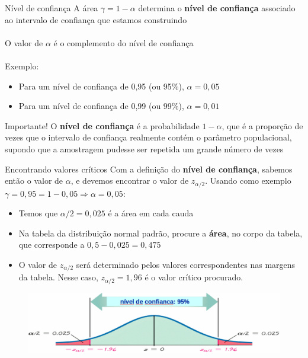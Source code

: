 \documentclass[10pt]{beamer}\usepackage[]{graphicx}\usepackage[]{color}
\theoremstyle{definition}
\begin{document}
\begin{frame}{Nível de confiança}
  A área $\gamma = 1 - \alpha$ determina o \textbf{nível de confiança}
  associado ao intervalo de confiança que estamos construindo \\~\\
  O valor de $\alpha$ é o complemento do nível de confiança\\~\\
  Exemplo:
  \begin{itemize}
  \item Para um nível de confiança de 0,95 (ou 95\%), $\alpha = 0,05$
  \item Para um nível de confiança de 0,99 (ou 99\%), $\alpha = 0,01$
  \end{itemize}
  \begin{alertblock}{Importante!}
    O \textbf{nível de confiança} é a probabilidade $1-\alpha$, que é a
    proporção de vezes que o intervalo de confiança realmente contém o
    parâmetro populacional, supondo que a amostragem pudesse ser
    repetida um grande número de vezes
  \end{alertblock}
\end{frame}

\begin{frame}{Encontrando valores críticos}
  Com a definição do \textbf{nível de confiança}, sabemos então o valor
  de $\alpha$, e devemos encontrar o valor de $z_{\alpha/2}$. Usando
  como exemplo $\gamma = 0,95 = 1 - 0,05 \Rightarrow \alpha = 0,05$:
  \begin{itemize}
  \item Temos que $\alpha/2 = 0,025$ é a área em cada cauda
  \item Na tabela da distribuição normal padrão, procure a
    \textbf{área}, no corpo da tabela, que corresponde a $0,5 - 0,025 =
    0,475$
  \item O valor de $z_{\alpha/2}$ será determinado pelos valores
    correspondentes nas margens da tabela. Nesse caso, $z_{\alpha/2} =
    1,96$ é o valor crítico procurado.
  \end{itemize}
  \begin{figure}[b]
    \centering
    \includegraphics[width=1\textwidth]{conf}
  \end{figure}
\end{frame}
\end{document}
